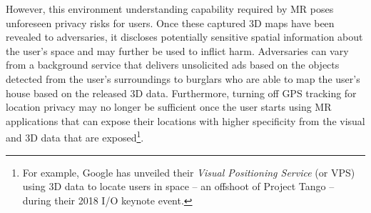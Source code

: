 However, this environment understanding capability required by MR poses unforeseen privacy risks for users. Once these captured 3D maps have been revealed to adversaries, it discloses potentially sensitive spatial information about the user's space and may further be used to inflict harm. Adversaries can vary from a background service that delivers unsolicited ads based on the objects detected from the user's surroundings to burglars who are able to map the user's house based on the released 3D data. Furthermore, turning off GPS tracking for location privacy may no longer be sufficient once the user starts using MR applications that can expose their locations with higher specificity from the visual and 3D data that are exposed\footnote{For example, Google has unveiled their \textit{Visual Positioning Service} (or VPS) using 3D data to locate users in space -- an offshoot of Project Tango -- during their 2018 I/O keynote event.}.



